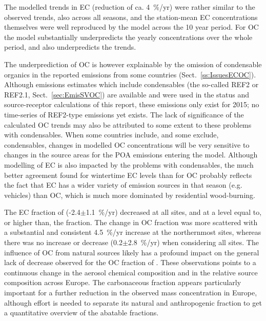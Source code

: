 The modelled trends in EC (reduction of ca. 4~\%/yr) were rather similar to the observed trends, also across all seasons, and the station-mean EC concentrations themselves were well reproduced by the model across the 10 year period. 
For OC the model substantially underpredicts the yearly concentrations over the whole period, and also underpredicts the trends.  

The underprediction of OC is however explainable by the omission of condensable organics in the reported \pmfine emissions from some countries (Sect.~\ref{ss:IssuesECOC}). Although emissions estimates which include condensables (the so-called REF2 or REF2.1, Sect.~\ref{sec:EmisSVOC}) are available and were used in the status and source-receptor calculations of this report, these emissions only exist for 2015; no time-series of REF2-type emissions yet exists. The lack of significance of the calculated OC trends may also be attributed to some extent to these problems with condensables. When some countries include, and some exclude, condensables, changes in modelled OC concentrations will be very sensitive to changes in the source areas for the POA emissions entering the model.
Although modelling of EC is also impacted by the problems with condensables, the much better agreement found for wintertime EC levels than for OC probably reflects the fact that EC has a wider variety of emission sources in that season (e.g. vehicles) than OC, which is much more dominated by residential wood-burning.

The EC fraction of \pmfine (-2.4$\pm$1.1~\%/yr) decreased at all
sites, and at a level equal to, or higher than, the  fraction. The
change in OC fraction was more scattered with a substantial and
consistent 4.5~\%/yr increase at the northernmost sites, whereas
there was no increase or decrease (0.2$\pm$2.8~\%/yr) when considering
all sites. The influence of OC from natural sources likely has a profound
impact on the general lack of decrease observed for the OC fraction of
\pmfine. These observations points to a continuous change in the aerosol
chemical composition and in the relative source composition across
Europe. The carbonaceous fraction appears particularly important for a
further reduction in the observed \pmfine mass concentration in Europe,
although effort is needed to separate its natural and anthropogenic
fraction to get a quantitative overview of the abatable fractions.
\\
\bigskip


